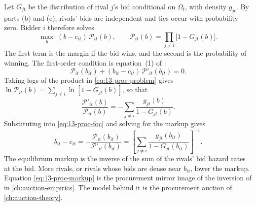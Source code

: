 Let $G_{jt}$ be the distribution of rival $j$'s bid conditional on $\Omega_t$, with density $g_{jt}$. By parts (b)
and (e), rivals' bids are independent and ties occur with probability zero. Bidder $i$ therefore solves
\begin{equation}\label{eq:13-proc-problem}
  \max_{b}\; (b - c_{it})\,\mathcal{P}_{it}(b), \qquad \mathcal{P}_{it}(b) = \prod_{j \neq i}\bigl[1 - G_{jt}(b)\bigr].
\end{equation}
The first term is the margin if the bid wins, and the second is the probability of winning. The first-order
condition is equation~(1) of \citet{PorterZona1993}:
\begin{equation}\label{eq:13-proc-foc}
  \mathcal{P}_{it}(b_{it}) + (b_{it} - c_{it})\,\mathcal{P}'_{it}(b_{it}) = 0 .
\end{equation}
Taking logs of the product in \eqref{eq:13-proc-problem} gives
$\ln\mathcal{P}_{it}(b) = \sum_{j\neq i}\ln[1 - G_{jt}(b)]$, so that
\begin{equation*}
  \frac{\mathcal{P}'_{it}(b)}{\mathcal{P}_{it}(b)} = -\sum_{j\neq i}\frac{g_{jt}(b)}{1 - G_{jt}(b)} .
\end{equation*}
Substituting into \eqref{eq:13-proc-foc} and solving for the markup gives
\begin{equation}\label{eq:13-proc-markup}
  b_{it} - c_{it} = -\frac{\mathcal{P}_{it}(b_{it})}{\mathcal{P}'_{it}(b_{it})}
  = \left[\sum_{j\neq i}\frac{g_{jt}(b_{it})}{1 - G_{jt}(b_{it})}\right]^{-1} .
\end{equation}
The equilibrium markup is the inverse of the sum of the rivals' bid hazard rates at the bid. More rivals, or rivals
whose bids are dense near $b_{it}$, lower the markup. Equation \eqref{eq:13-proc-markup} is the procurement mirror
image of the inversion of \citet{GuerrePerrigneVuong2000} in \cref{ch:auction-empirics}. The model behind it is the
procurement auction of \cref{ch:auction-theory}.

